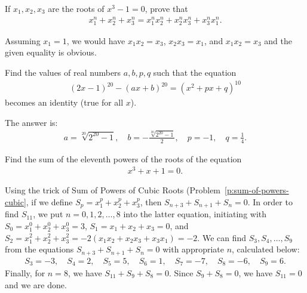 \documentclass[12pt,a4paper]{memoir}
\theoremstyle{definition}
\begin{document}
\begin{question}
	If $x_1,x_2,x_3$ are the roots of $x^3-1=0$, prove that
	\begin{align*}
		x_1^n+x_2^n+x_3^n = x_1^nx_2^n + x_2^nx_3^n + x_3^nx_1^n.
	\end{align*}
\end{question}

\begin{solution}
	Assuming $x_1=1$, we would have $x_1x_2=x_3$, $x_2x_3=x_1$, and $x_1x_2=x_3$ and the given equality is obvious.
\end{solution}


\begin{question}
	Find the values of real numbers $a,b,p,q$ such that the equation
	\begin{align*}
		(2x-1)^{20} - (ax+b)^{20} = (x^2+px+q)^{10}
	\end{align*}
	becomes an identity  (true for all $x$).
\end{question}

\begin{solution}
	The answer is:
	\begin{align*}
		a= \sqrt[20]{2^{20}-1}, \quad b=-\frac{\sqrt[20]{2^{20}-1}}{2}, \quad p=-1, \quad q=\frac{1}{4}.
	\end{align*}
\end{solution}

\begin{question}
	Find the sum of the eleventh powers of the roots of the equation 
	\begin{align*}
		x^3+x+1=0.
	\end{align*}
\end{question}

\begin{solution}[name=Solution by Parviz Shahriari]
	Using the trick of Sum of Powers of Cubic Roots (Problem~\ref{p:sum-of-powers-cubic}, if we define $S_p=x_1^p+x_2^p+x_3^p$, then $S_{n+3}+S_{n+1}+S_{n}=0$. In order to find $S_{11}$, we put $n=0,1,2,\dots,8$ into the latter equation, initiating with $S_0=x_1^0+x_2^0+x_3^0=3$, $S_1=x_1+x_2+x_3=0$, and $S_2 = x_1^2+x_2^2+x_3^2=-2(x_1x_2+x_2x_3+x_3x_1)=-2$. We can find $S_3,S_4,\dots,S_9$ from the equations $S_{n+3}+S_{n+1}+S_{n}=0$ with appropriate $n$, calculated below:
	\begin{align*}
		S_3 = -3, \quad S_4=2, \quad S_5 = 5, \quad S_6=1, \quad S_7=-7, \quad S_8=-6, \quad S_9=6.
	\end{align*}
	Finally, for $n=8$, we have $S_{11}+S_9+S_8=0$. Since $S_9+S_8=0$, we have $S_{11}=0$ and we are done.
\end{solution}
\end{document}
